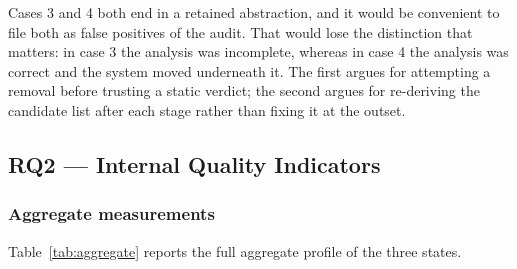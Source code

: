 \documentclass{sbc2019}%
\begin{document}
Cases 3 and 4 both end in a retained abstraction, and it would be convenient to
file both as false positives of the audit. That would lose the distinction that
matters: in case 3 the analysis was incomplete, whereas in case 4 the analysis
was correct and the system moved underneath it. The first argues for attempting
a removal before trusting a static verdict; the second argues for re-deriving
the candidate list after each stage rather than fixing it at the outset.

\subsection{RQ2 --- Internal Quality Indicators}\label{sec:rq2}

\subsubsection{Aggregate measurements}

Table~\ref{tab:aggregate} reports the full aggregate profile of the three
states.
\end{document}
